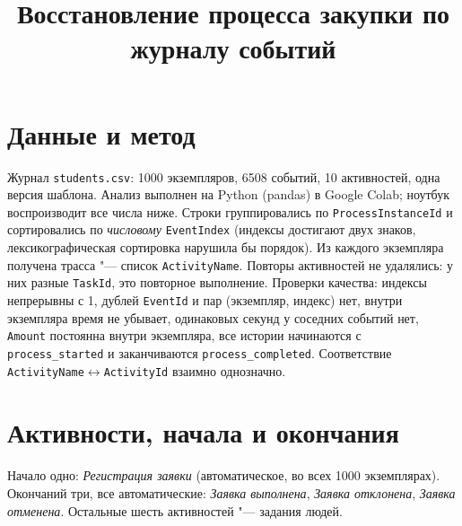 \documentclass[11pt,a4paper]{article}
\title{Восстановление процесса закупки по журналу событий}
\author{}\date{}
\begin{document}
\maketitle\vspace{-2em}

\section{Данные и метод}
Журнал \texttt{students.csv}: 1000 экземпляров, 6508 событий, 10 активностей, одна версия шаблона. Анализ выполнен на Python (pandas) в Google Colab; ноутбук воспроизводит все числа ниже. Строки группировались по \texttt{ProcessInstanceId} и сортировались по \emph{числовому} \texttt{EventIndex} (индексы достигают двух знаков, лексикографическая сортировка нарушила бы порядок). Из каждого экземпляра получена трасса "--- список \texttt{ActivityName}. Повторы активностей не удалялись: у них разные \texttt{TaskId}, это повторное выполнение. Проверки качества: индексы непрерывны с 1, дублей \texttt{EventId} и пар (экземпляр, индекс) нет, внутри экземпляра время не убывает, одинаковых секунд у соседних событий нет, \texttt{Amount} постоянна внутри экземпляра, все истории начинаются с \texttt{process\_started} и заканчиваются \texttt{process\_completed}. Соответствие \texttt{ActivityName}$\leftrightarrow$\texttt{ActivityId} взаимно однозначно.

\section{Активности, начала и окончания}
Начало одно: \emph{Регистрация заявки} (автоматическое, во всех 1000 экземплярах). Окончаний три, все автоматические: \emph{Заявка выполнена}, \emph{Заявка отклонена}, \emph{Заявка отменена}. Остальные шесть активностей "--- задания людей.
\end{document}
